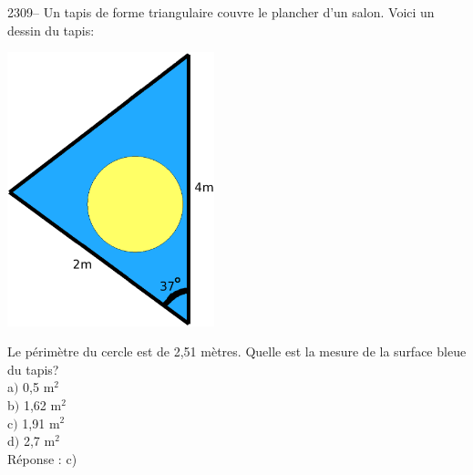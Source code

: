 \documentclass[letterpaper, 12pt]{article}
\begin{document}
2309--  Un tapis de forme triangulaire couvre le plancher d'un salon. Voici un dessin du tapis:
\begin{center}
 \includegraphics[width=6cm,bb=14 14 627 807]{Q2309.eps}
\end{center}
Le p\'erim\`etre du cercle est de 2,51 m\`etres. Quelle est la mesure de la surface bleue du tapis? \\

a$)$ 0,5 m$^{2}$\\
b$)$ 1,62 m$^{2}$\\
c$)$ 1,91 m$^{2}$\\
d$)$ 2,7 m$^{2}$\\

R\'eponse : c)\\
\end{document}
